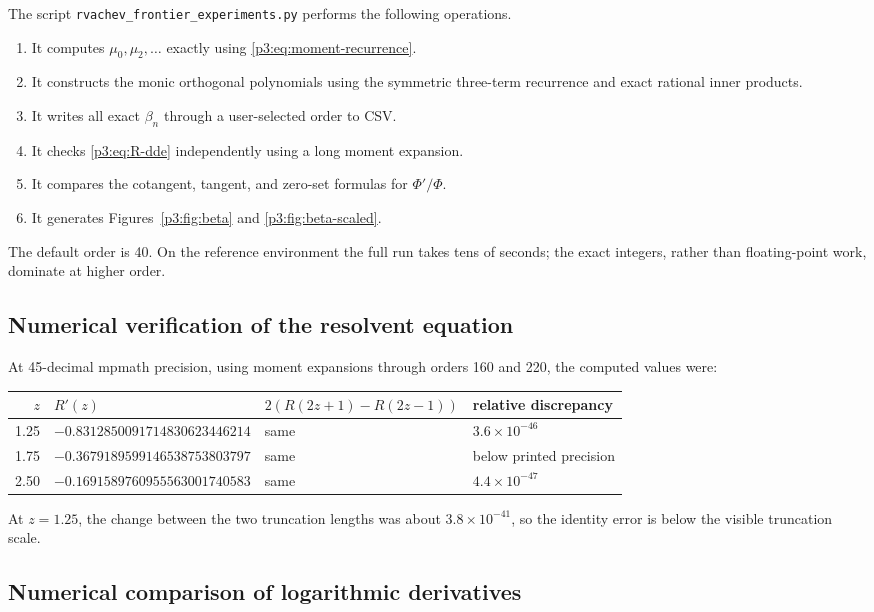 \documentclass[11pt]{article}
\theoremstyle{definition}
\theoremstyle{remark}
\begin{document}
The script \texttt{rvachev\_frontier\_experiments.py} performs the following operations.

\begin{enumerate}
\item It computes \(\mu_0,\mu_2,\dots\) exactly using \eqref{p3:eq:moment-recurrence}.
\item It constructs the monic orthogonal polynomials using the symmetric three-term
      recurrence and exact rational inner products.
\item It writes all exact \(\beta_n\) through a user-selected order to CSV.
\item It checks \eqref{p3:eq:R-dde} independently using a long moment expansion.
\item It compares the cotangent, tangent, and zero-set formulas for \(\Phi'/\Phi\).
\item It generates Figures~\ref{p3:fig:beta} and \ref{p3:fig:beta-scaled}.
\end{enumerate}

The default order is 40.  On the reference environment the full run takes tens of seconds;
the exact integers, rather than floating-point work, dominate at higher order.

\subsection{Numerical verification of the resolvent equation}

At 45-decimal mpmath precision, using moment expansions through orders 160 and 220, the
computed values were:
\begin{center}
\footnotesize
\begin{tabular}{rlll}
\toprule
\(z\) & \(R'(z)\) & \(2(R(2z+1)-R(2z-1))\) & relative discrepancy \\
\midrule
1.25 & \(-0.8312850091714830623446214\) & same & \(3.6\times10^{-46}\) \\
1.75 & \(-0.3679189599146538753803797\) & same & below printed precision \\
2.50 & \(-0.1691589760955563001740583\) & same & \(4.4\times10^{-47}\) \\
\bottomrule
\end{tabular}
\end{center}
At \(z=1.25\), the change between the two truncation lengths was about
\(3.8\times10^{-41}\), so the identity error is below the visible truncation scale.

\subsection{Numerical comparison of logarithmic derivatives}
\end{document}
